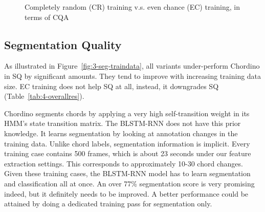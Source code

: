 \begin{figure}[htb]
\centering
{}
\caption{Completely random (CR) training v.s. even chance (EC) training, in terms of CQA}
\label{fig:3-EC-CQA}
\end{figure}

\subsection{Segmentation Quality}
As illustrated in Figure~\ref{fig:3-seg-traindata}, all variants under-perform Chordino in SQ by significant amounts. They tend to improve with increasing training data size. EC training does not help SQ at all, instead, it downgrades SQ (Table~\ref{tab:4-overallres}).

Chordino segments chords by applying a very high self-transition weight in its HMM's state transition matrix. The BLSTM-RNN does not have this prior knowledge. It learns segmentation by looking at annotation changes in the training data. Unlike chord labels, segmentation information is implicit. Every training case contains 500 frames, which is about 23 seconds under our feature extraction settings. This corresponds to approximately 10-30 chord changes. Given these training cases, the BLSTM-RNN model has to learn segmentation and classification all at once. An over 77\% segmentation score is very promising indeed, but it definitely needs to be improved. A better performance could be attained by doing a dedicated training pass for segmentation only.

